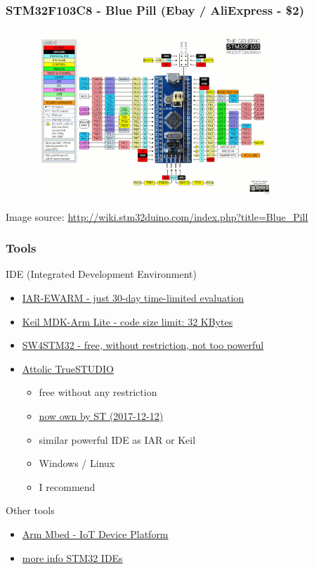 \documentclass[12;pt,t]{beamer} %
\newcommand{\srctext}[1]{{\fontsize{7}{9}\selectfont\textcolor{sourcesclr}{#1}}}
\begin{document}
\begin{frame}
\frametitle{STM32F103C8 - Blue Pill (Ebay / AliExpress - \$2)}
	
	\begin{figure}[H]
		\includegraphics[width=0.8\textwidth]{img/Bluepillpinout.jpg}
	\end{figure}
	\srctext{Image source: \url{http://wiki.stm32duino.com/index.php?title=Blue_Pill}}
\end{frame}


\begin{frame}
\frametitle{Tools}
   	IDE (Integrated Development Environment) 
   	\begin{itemize}[label=$\bullet$]
   		\item \href{https://www.iar.com/iar-embedded-workbench/}{IAR-EWARM - just 30-day time-limited evaluation}
   		\item \href{http://www2.keil.com/mdk5/selector}{Keil MDK-Arm Lite - code size limit: 32 KBytes}
   		\item \href{http://www2.keil.com/mdk5/selector}{SW4STM32 - free, without restriction, not too powerful}
   		\item \href{http://www.st.com/en/development-tools/sw4stm32.html}{Attolic TrueSTUDIO}
   		\begin{itemize}[label=$\cdot$]
   			\item free without any restriction
   			\item \href{https://atollic.com/truestudio/}{now own by ST (2017-12-12)}
   			\item similar powerful IDE as IAR or Keil 
   			\item Windows / Linux
   			\item I recommend 
   		\end{itemize} 
   	\end{itemize}
   Other tools
   \begin{itemize}
   	\item \href{https://www.mbed.com/}{Arm Mbed - IoT Device Platform}
   	\item \href{http://www.st.com/en/development-tools/stm32-ides.html}{more info STM32 IDEs}
   \end{itemize}
\end{frame}
\end{document}
